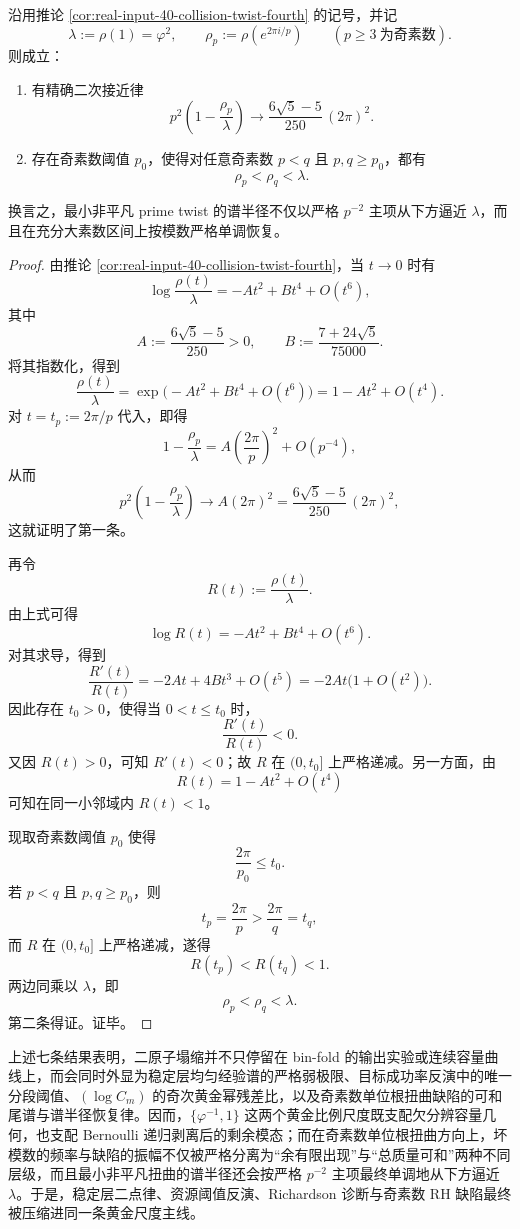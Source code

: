 \begin{theorem}[奇素数最小非平凡单位根扭曲的谱半径二次接近律与最终严格单调逼近]\label{thm:xi-time-part70-prime-twist-spectral-radius-quadratic-approach}
沿用推论 \ref{cor:real-input-40-collision-twist-fourth} 的记号，并记
\[
\lambda:=\rho(1)=\varphi^2,
\qquad
\rho_p:=\rho\!\left(e^{2\pi i/p}\right)
\qquad
(p\ge 3\ \text{为奇素数}).
\]
则成立：
\begin{enumerate}
  \item 有精确二次接近律
  \[
  \boxed{\;
  p^2\left(1-\frac{\rho_p}{\lambda}\right)
  \longrightarrow
  \frac{6\sqrt5-5}{250}\,(2\pi)^2.\;}
  \]
  \item 存在奇素数阈值 \(p_0\)，使得对任意奇素数 \(p<q\) 且 \(p,q\ge p_0\)，都有
  \[
  \boxed{\;
  \rho_p<\rho_q<\lambda.\;}
  \]
\end{enumerate}
换言之，最小非平凡 prime twist 的谱半径不仅以严格 \(p^{-2}\) 主项从下方逼近 \(\lambda\)，而且在充分大素数区间上按模数严格单调恢复。
\end{theorem}
\begin{proof}
由推论 \ref{cor:real-input-40-collision-twist-fourth}，当 \(t\to 0\) 时有
\[
\log\frac{\rho(t)}{\lambda}
=
-A t^2+B t^4+O(t^6),
\]
其中
\[
A:=\frac{6\sqrt5-5}{250}>0,
\qquad
B:=\frac{7+24\sqrt5}{75000}.
\]
将其指数化，得到
\[
\frac{\rho(t)}{\lambda}
=
\exp\!\bigl(-A t^2+B t^4+O(t^6)\bigr)
=
1-A t^2+O(t^4).
\]
对 \(t=t_p:=2\pi/p\) 代入，即得
\[
1-\frac{\rho_p}{\lambda}
=
A\left(\frac{2\pi}{p}\right)^2+O(p^{-4}),
\]
从而
\[
p^2\left(1-\frac{\rho_p}{\lambda}\right)
\longrightarrow
A(2\pi)^2
=
\frac{6\sqrt5-5}{250}\,(2\pi)^2,
\]
这就证明了第一条。

再令
\[
R(t):=\frac{\rho(t)}{\lambda}.
\]
由上式可得
\[
\log R(t)=-A t^2+B t^4+O(t^6).
\]
对其求导，得到
\[
\frac{R'(t)}{R(t)}
=
-2At+4Bt^3+O(t^5)
=
-2At\bigl(1+O(t^2)\bigr).
\]
因此存在 \(t_0>0\)，使得当 \(0<t\le t_0\) 时，
\[
\frac{R'(t)}{R(t)}<0.
\]
又因 \(R(t)>0\)，可知 \(R'(t)<0\)；故 \(R\) 在 \((0,t_0]\) 上严格递减。另一方面，由
\[
R(t)=1-A t^2+O(t^4)
\]
可知在同一小邻域内 \(R(t)<1\)。

现取奇素数阈值 \(p_0\) 使得
\[
\frac{2\pi}{p_0}\le t_0.
\]
若 \(p<q\) 且 \(p,q\ge p_0\)，则
\[
t_p=\frac{2\pi}{p}>\frac{2\pi}{q}=t_q,
\]
而 \(R\) 在 \((0,t_0]\) 上严格递减，遂得
\[
R(t_p)<R(t_q)<1.
\]
两边同乘以 \(\lambda\)，即
\[
\rho_p<\rho_q<\lambda.
\]
第二条得证。证毕。
\end{proof}

\noindent
上述七条结果表明，二原子塌缩并不只停留在 bin-fold 的输出实验或连续容量曲线上，而会同时外显为稳定层均匀经验谱的严格弱极限、目标成功率反演中的唯一分段阈值、\((\log C_m)\) 的奇次黄金幂残差比，以及奇素数单位根扭曲缺陷的可和尾谱与谱半径恢复律。因而，\(\{\varphi^{-1},1\}\) 这两个黄金比例尺度既支配欠分辨容量几何，也支配 Bernoulli 递归剥离后的剩余模态；而在奇素数单位根扭曲方向上，坏模数的频率与缺陷的振幅不仅被严格分离为“余有限出现”与“总质量可和”两种不同层级，而且最小非平凡扭曲的谱半径还会按严格 \(p^{-2}\) 主项最终单调地从下方逼近 \(\lambda\)。于是，稳定层二点律、资源阈值反演、Richardson 诊断与奇素数 RH 缺陷最终被压缩进同一条黄金尺度主线。

